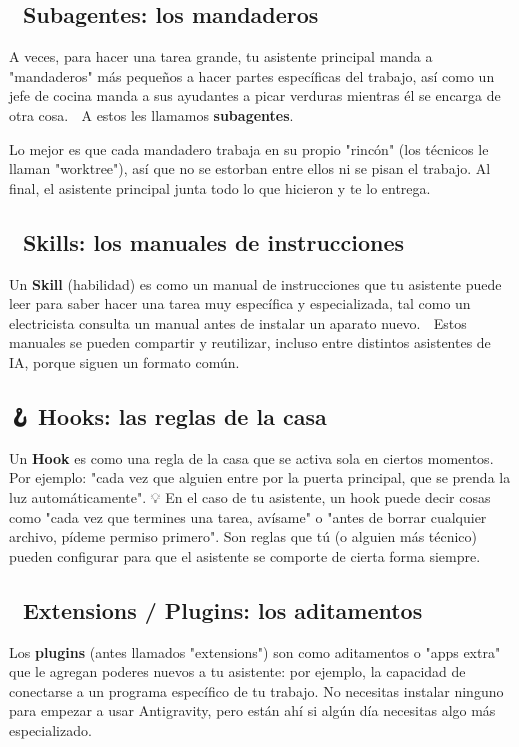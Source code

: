 \documentclass[12pt]{article}
\begin{document}
\subsection{🏃 Subagentes: los mandaderos}
A veces, para hacer una tarea grande, tu asistente principal manda a "mandaderos" más pequeños a hacer partes específicas del trabajo, así como un jefe de cocina manda a sus ayudantes a picar verduras mientras él se encarga de otra cosa. 🔪 A estos les llamamos \textbf{subagentes}.

Lo mejor es que cada mandadero trabaja en su propio "rincón" (los técnicos le llaman "worktree"), así que no se estorban entre ellos ni se pisan el trabajo. Al final, el asistente principal junta todo lo que hicieron y te lo entrega. 🧺

\subsection{📖 Skills: los manuales de instrucciones}
Un \textbf{Skill} (habilidad) es como un manual de instrucciones que tu asistente puede leer para saber hacer una tarea muy específica y especializada, tal como un electricista consulta un manual antes de instalar un aparato nuevo. 🔌 Estos manuales se pueden compartir y reutilizar, incluso entre distintos asistentes de IA, porque siguen un formato común.

\subsection{🪝 Hooks: las reglas de la casa}
Un \textbf{Hook} es como una regla de la casa que se activa sola en ciertos momentos. Por ejemplo: "cada vez que alguien entre por la puerta principal, que se prenda la luz automáticamente". 💡 En el caso de tu asistente, un hook puede decir cosas como "cada vez que termines una tarea, avísame" o "antes de borrar cualquier archivo, pídeme permiso primero". Son reglas que tú (o alguien más técnico) pueden configurar para que el asistente se comporte de cierta forma siempre.

\subsection{🧩 Extensions / Plugins: los aditamentos}
Los \textbf{plugins} (antes llamados "extensions") son como aditamentos o "apps extra" que le agregan poderes nuevos a tu asistente: por ejemplo, la capacidad de conectarse a un programa específico de tu trabajo. No necesitas instalar ninguno para empezar a usar Antigravity, pero están ahí si algún día necesitas algo más especializado. 🔧
\end{document}
